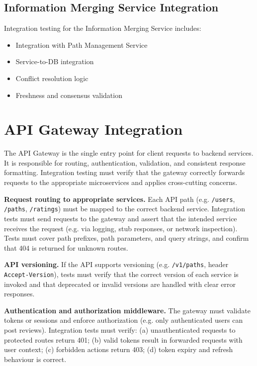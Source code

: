 \subsection{Information Merging Service Integration}
\label{subsec:information_merging_service_integration}%

Integration testing for the Information Merging Service includes:
\begin{itemize}
    \item Integration with Path Management Service
    \item Service-to-DB integration
    \item Conflict resolution logic
    \item Freshness and consensus validation
\end{itemize}

\section{API Gateway Integration}
\label{sec:api_gateway_integration}%

The API Gateway is the single entry point for client requests to backend services. It is responsible for routing, authentication, validation, and consistent response formatting. Integration testing must verify that the gateway correctly forwards requests to the appropriate microservices and applies cross-cutting concerns.

\textbf{Request routing to appropriate services.}
Each API path (e.g. \texttt{/users}, \texttt{/paths}, \texttt{/ratings}) must be mapped to the correct backend service. Integration tests must send requests to the gateway and assert that the intended service receives the request (e.g. via logging, stub responses, or network inspection). Tests must cover path prefixes, path parameters, and query strings, and confirm that 404 is returned for unknown routes.

\textbf{API versioning.}
If the API supports versioning (e.g. \texttt{/v1/paths}, header \texttt{Accept-Version}), tests must verify that the correct version of each service is invoked and that deprecated or invalid versions are handled with clear error responses.

\textbf{Authentication and authorization middleware.}
The gateway must validate tokens or sessions and enforce authorization (e.g. only authenticated users can post reviews). Integration tests must verify: (a) unauthenticated requests to protected routes return 401; (b) valid tokens result in forwarded requests with user context; (c) forbidden actions return 403; (d) token expiry and refresh behaviour is correct.

